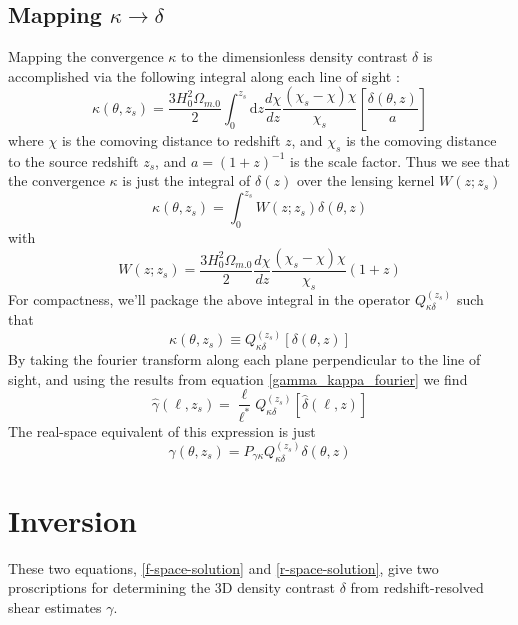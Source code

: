 \documentclass[12pt,preprint]{aastex}			%
\newcommand{\rcom}{\chi}     %
\newcommand{\dd}{\mathrm{d}} %
\begin{document}
\subsection{Mapping $\kappa\to\delta$}
Mapping the convergence $\kappa$ to the dimensionless density contrast
$\delta$ is accomplished via the following integral along each line of sight
\citep[see][eqn 24]{Hu02}:
\begin{equation}
  \label{kappa_delta}
  \kappa(\theta,z_s)=\frac{3H_0^2\Omega_{m.0}}{2}\int_0^{z_s}\dd z 
  \frac{d\rcom}{dz} \frac{(\rcom_s-\rcom)\rcom}{\rcom_s}
  \left[\frac{\delta(\theta,z)}{a}\right]
\end{equation}
where $\rcom$ is the comoving distance to redshift $z$, and $\rcom_s$ is the 
comoving distance to the source redshift $z_s$, and $a=(1+z)^{-1}$
is the scale factor.  Thus we see that the 
convergence $\kappa$ is just the integral of $\delta(z)$ over the
lensing kernel $W(z;z_s)$
\begin{equation}
  \kappa(\theta,z_s) = \int_0^{z_s} W(z;z_s)\delta(\theta,z)
\end{equation}
with
\begin{equation}
  W(z;z_s) = \frac{3H_0^2\Omega_{m.0}}{2}\frac{d\rcom}{dz} 
  \frac{(\rcom_s-\rcom)\rcom}{\rcom_s}(1+z)
\end{equation}
For compactness, we'll package the above integral in the 
operator $Q_{\kappa\delta}^{(z_s)}$ such that
\begin{equation}
  \kappa(\theta,z_s) \equiv Q_{\kappa\delta}^{(z_s)}\left[\delta(\theta,z)\right]
\end{equation}
By taking the fourier transform along each plane perpendicular to the line
of sight, and using the results from equation \ref{gamma_kappa_fourier}
we find
\begin{equation}
  \label{f-space-solution}
  \hat\gamma(\ell,z_s) 
  = \frac{\ell}{\ell^*} Q_{\kappa\delta}^{(z_s)}\left[\hat\delta(\ell,z)\right]
\end{equation}
The real-space equivalent of this expression is just
\begin{equation}
  \label{r-space-solution}
  \gamma(\theta,z_s) = P_{\gamma\kappa}Q_{\kappa\delta}^{(z_s)}\delta(\theta,z)
\end{equation}

\section{Inversion}
These two equations, \ref{f-space-solution} and \ref{r-space-solution}, give
two proscriptions for determining the 3D density contrast $\delta$ from 
redshift-resolved shear estimates $\gamma$.





\end{document}
